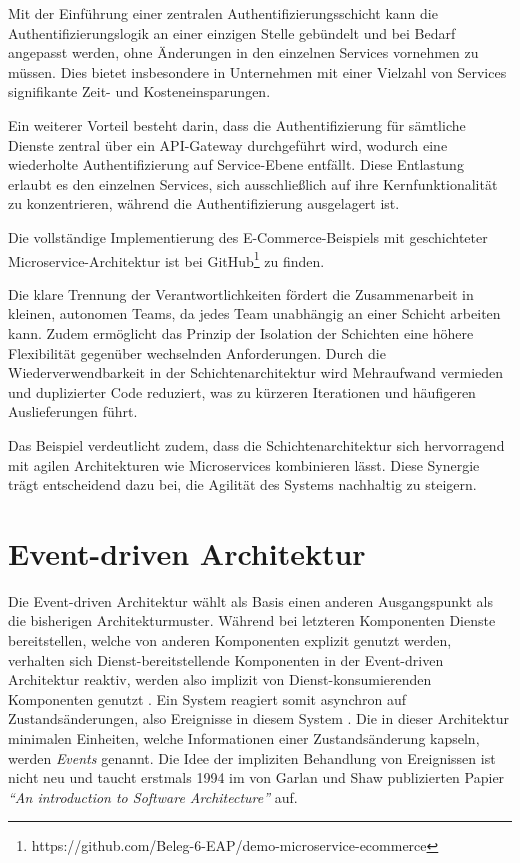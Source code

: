 \documentclass[acmtog]{acmart}
\begin{document}
Mit der Einführung einer zentralen Authentifizierungsschicht kann die Authentifizierungslogik
an einer einzigen Stelle gebündelt und bei Bedarf angepasst werden, ohne Änderungen in den
einzelnen Services vornehmen zu müssen.
Dies bietet insbesondere in Unternehmen mit einer Vielzahl von Services signifikante Zeit- und Kosteneinsparungen.

Ein weiterer Vorteil besteht darin, dass die Authentifizierung für sämtliche Dienste
zentral über ein API-Gateway durchgeführt wird, wodurch eine wiederholte Authentifizierung
auf Service-Ebene entfällt.
Diese Entlastung erlaubt es den einzelnen Services, sich ausschließlich auf ihre
Kernfunktionalität zu konzentrieren, während die Authentifizierung ausgelagert ist.

Die vollständige Implementierung des E-Commerce-Beispiels mit geschichteter Microservice-Architektur
ist bei GitHub\footnote{https://github.com/Beleg-6-EAP/demo-microservice-ecommerce} zu finden.

Die klare Trennung der Verantwortlichkeiten fördert die Zusammenarbeit in kleinen, autonomen
Teams, da jedes Team unabhängig an einer Schicht arbeiten kann.
Zudem ermöglicht das Prinzip der Isolation der Schichten eine höhere Flexibilität gegenüber wechselnden Anforderungen.
Durch die Wiederverwendbarkeit in der Schichtenarchitektur wird Mehraufwand vermieden und duplizierter
Code reduziert, was zu kürzeren Iterationen und häufigeren Auslieferungen führt.

Das Beispiel verdeutlicht zudem, dass die Schichtenarchitektur sich hervorragend mit agilen
Architekturen wie Microservices kombinieren lässt.
Diese Synergie trägt entscheidend dazu bei, die Agilität des Systems nachhaltig zu steigern.

\section{Event-driven Architektur}
\label{sec:eda}
Die Event-driven Architektur wählt als Basis einen anderen Ausgangspunkt als die bisherigen Architekturmuster.
Während bei letzteren Komponenten Dienste bereitstellen, welche von anderen Komponenten explizit genutzt werden,
verhalten sich Dienst-bereitstellende Komponenten in der Event-driven Architektur reaktiv,
werden also implizit von Dienst-konsumierenden Komponenten genutzt \cite{garlanShawImplizit}.
Ein System reagiert somit asynchron auf Zustandsänderungen, also Ereignisse in diesem System \cite{eda}.
Die in dieser Architektur minimalen Einheiten, welche Informationen einer Zustandsänderung kapseln, werden \textit{Events} genannt.
Die Idee der impliziten Behandlung von Ereignissen ist nicht neu und taucht erstmals 1994 im von Garlan und Shaw publizierten Papier
\textit{\enquote{An introduction to Software Architecture}} auf.
\end{document}
